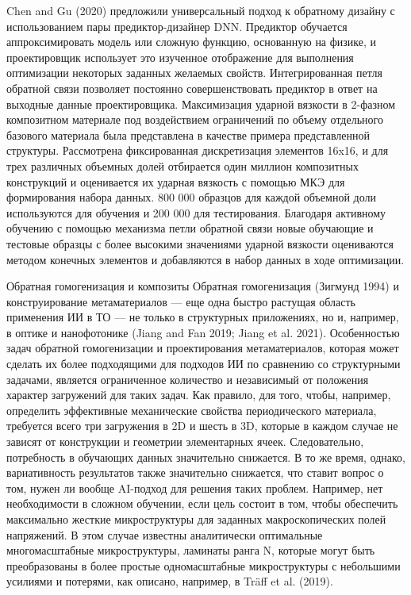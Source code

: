 Chen and Gu (2020) предложили универсальный подход к обратному дизайну с использованием пары предиктор-дизайнер DNN. Предиктор обучается аппроксимировать модель или сложную функцию, основанную на физике, и проектировщик использует это изученное отображение для выполнения оптимизации некоторых заданных желаемых свойств. Интегрированная петля обратной связи позволяет постоянно совершенствовать предиктор в ответ на выходные данные проектировщика. Максимизация ударной вязкости в 2-фазном композитном материале под воздействием ограничений по объему отдельного базового материала была представлена в качестве примера представленной структуры. Рассмотрена фиксированная дискретизация элементов 16x16, и для трех различных объемных долей отбирается один миллион композитных конструкций и оценивается их ударная вязкость с помощью МКЭ для формирования набора данных. 800 000 образцов для каждой объемной доли используются для обучения и 200 000 для тестирования. Благодаря активному обучению с помощью механизма петли обратной связи новые обучающие и тестовые образцы с более высокими значениями ударной вязкости оцениваются методом конечных элементов и добавляются в набор данных в ходе оптимизации.

Обратная гомогенизация и композиты Обратная гомогенизация (Зигмунд 1994) и конструирование метаматериалов — еще одна быстро растущая область применения ИИ в ТО — не только в структурных приложениях, но и, например, в оптике и нанофотонике (Jiang and Fan 2019; Jiang et al. 2021). Особенностью задач обратной гомогенизации и проектирования метаматериалов, которая может сделать их более подходящими для подходов ИИ по сравнению со структурными задачами, является ограниченное количество и независимый от положения характер загружений для таких задач. Как правило, для того, чтобы, например, определить эффективные механические свойства периодического материала, требуется всего три загружения в 2D и шесть в 3D, которые в каждом случае не зависят от конструкции и геометрии элементарных ячеек. Следовательно, потребность в обучающих данных значительно снижается. В то же время, однако, вариативность результатов также значительно снижается, что ставит вопрос о том, нужен ли вообще AI-подход для решения таких проблем. Например, нет необходимости в сложном обучении, если цель состоит в том, чтобы обеспечить максимально жесткие микроструктуры для заданных макроскопических полей напряжений. В этом случае известны аналитически оптимальные многомасштабные микроструктуры, ламинаты ранга N, которые могут быть преобразованы в более простые одномасштабные микроструктуры с небольшими усилиями и потерями, как описано, например, в Träff et al. (2019).

